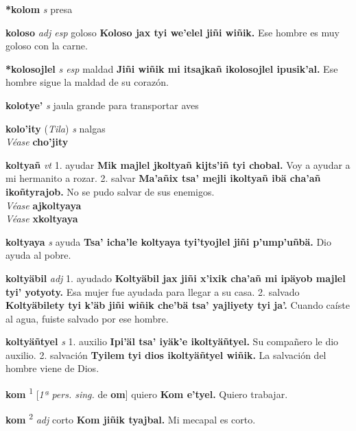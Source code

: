 \documentclass[10pt]{scrbook}
\newcommand{\entry}[1]{\textbf{#1}}
\newcommand{\onedefinition}[1]{#1.}
\newcommand{\defsuperscript}[1]{\textsuperscript{#1}}
\newcommand{\partofspeech}[1]{\textit{#1}}
\newcommand{\spanishtranslation}[1]{#1}
\newcommand{\cholexample}[1]{\textbf{#1}}
\newcommand{\exampletranslation}[1]{#1}
\newcommand{\alsosee}[1]{\\\textit{Véase} \textbf{#1}}
\newcommand{\relevantdialect}[1]{(\textit{#1})}
\newcommand{\conjugationtense}[1]{[\textit{#1}}
\newcommand{\conjugationverb}[1]{de \textbf{#1}]}
\begin{document}
\begin{multicols}{2}
\entry{*kolom}
\partofspeech{s}
\spanishtranslation{presa}

\entry{koloso}
\partofspeech{adj esp}
\spanishtranslation{goloso}
\cholexample{Koloso jax tyi we'elel jiñi wiñik.}
\exampletranslation{Ese hombre es muy goloso con la carne.}

\entry{*kolosojlel}
\partofspeech{s esp}
\spanishtranslation{maldad}
\cholexample{Jiñi wiñik mi itsajkañ ikolosojlel ipusik'al.}
\exampletranslation{Ese hombre sigue la maldad de su corazón.}

\entry{kolotye'}
\partofspeech{s}
\spanishtranslation{jaula grande para transportar aves}

\entry{kolo'ity}
\relevantdialect{Tila}
\partofspeech{s}
\spanishtranslation{nalgas}
\alsosee{cho'jity}

\entry{koltyañ}
\partofspeech{vt}
\onedefinition{1}
\spanishtranslation{ayudar}
\cholexample{Mik majlel jkoltyañ kijts'iñ tyi chobal.}
\exampletranslation{Voy a ayudar a mi hermanito a rozar.}
\onedefinition{2}
\spanishtranslation{salvar}
\cholexample{Ma'añix tsa' mejli ikoltyañ ibä cha'añ ikoñtyrajob.}
\exampletranslation{No se pudo salvar de sus enemigos.}
\alsosee{ajkoltyaya}
\alsosee{xkoltyaya}

\entry{koltyaya}
\partofspeech{s}
\spanishtranslation{ayuda}
\cholexample{Tsa' icha'le koltyaya tyi'tyojlel jiñi p'ump'uñbä.}
\exampletranslation{Dio ayuda al pobre.}

\entry{koltyäbil}
\partofspeech{adj}
\onedefinition{1}
\spanishtranslation{ayudado}
\cholexample{Koltyäbil jax jiñi x'ixik cha'añ mi ipäyob majlel tyi' yotyoty.}
\exampletranslation{Esa mujer fue ayudada para llegar a su casa.}
\onedefinition{2}
\spanishtranslation{salvado}
\cholexample{Koltyäbilety tyi k'äb jiñi wiñik che'bä tsa' yajliyety tyi ja'.}
\exampletranslation{Cuando caíste al agua, fuiste salvado por ese hombre.}

\entry{koltyäñtyel}
\partofspeech{s}
\onedefinition{1}
\spanishtranslation{auxilio}
\cholexample{Ipi'äl tsa' iyäk'e ikoltyäñtyel.}
\exampletranslation{Su compañero le dio auxilio.}
\onedefinition{2}
\spanishtranslation{salvación}
\cholexample{Tyilem tyi dios ikoltyäñtyel wiñik.}
\exampletranslation{La salvación del hombre viene de Dios.}

\entry{kom}
\defsuperscript{1}
\conjugationtense{1ª pers. sing.}
\conjugationverb{om}
\spanishtranslation{quiero}
\cholexample{Kom e'tyel.}
\exampletranslation{Quiero trabajar.}

\entry{kom}
\defsuperscript{2}
\partofspeech{adj}
\spanishtranslation{corto}
\cholexample{Kom jiñik tyajbal.}
\exampletranslation{Mi mecapal es corto.}


\end{multicols}
\end{document}
